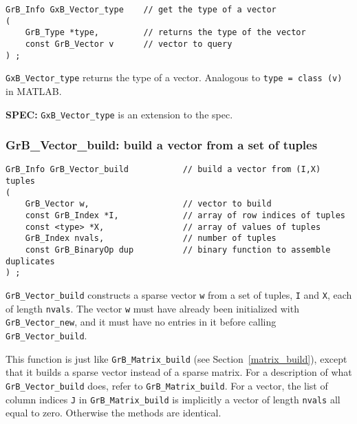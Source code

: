 \documentclass[12pt]{article}
\begin{document}
\begin{mdframed}[userdefinedwidth=6in]
{\footnotesize
\begin{verbatim}
GrB_Info GxB_Vector_type    // get the type of a vector
(
    GrB_Type *type,         // returns the type of the vector
    const GrB_Vector v      // vector to query
) ;
\end{verbatim}
} \end{mdframed}

\verb'GxB_Vector_type' returns the type of a vector.  Analogous to
\verb'type = class (v)' in MATLAB.

\begin{spec}
{\bf SPEC:} \verb'GxB_Vector_type' is an extension to the spec.
\end{spec}

\subsubsection{{\sf GrB\_Vector\_build:}         build a vector from a set of tuples}
\label{vector_build}

\begin{mdframed}[userdefinedwidth=6in]
{\footnotesize
\begin{verbatim}
GrB_Info GrB_Vector_build           // build a vector from (I,X) tuples
(
    GrB_Vector w,                   // vector to build
    const GrB_Index *I,             // array of row indices of tuples
    const <type> *X,                // array of values of tuples
    GrB_Index nvals,                // number of tuples
    const GrB_BinaryOp dup          // binary function to assemble duplicates
) ;
\end{verbatim}
} \end{mdframed}

\verb'GrB_Vector_build' constructs a sparse vector \verb'w' from a set of
tuples, \verb'I' and \verb'X', each of length \verb'nvals'.  The vector
\verb'w' must have already been initialized with \verb'GrB_Vector_new', and it
must have no entries in it before calling \verb'GrB_Vector_build'.

This function is just like \verb'GrB_Matrix_build' (see
Section~\ref{matrix_build}), except that it builds a sparse vector instead of a
sparse matrix.  For a description of what \verb'GrB_Vector_build' does, refer
to \verb'GrB_Matrix_build'.  For a vector, the list of column indices \verb'J'
in \verb'GrB_Matrix_build' is implicitly a vector of length \verb'nvals' all
equal to zero.  Otherwise the methods are identical.
\end{document}
